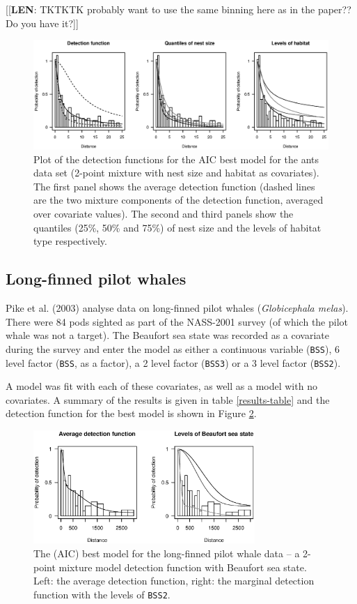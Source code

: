 \documentclass[useAMS,referee, usegraphicx]{biom}
\begin{document}
[[\textbf{LEN}: TKTKTK probably want to use the same binning here as in the paper?? Do you have it?]]

\begin{figure}
\centering
\includegraphics[width=\textwidth]{analyses/ants-nesthab.eps}
\caption{Plot of the detection functions for the AIC best model for the ants data set (2-point mixture with nest size and habitat as covariates). The first panel shows the average detection function (dashed lines are the two mixture components of the detection function, averaged over covariate values). The second and third panels show the quantiles (25\%, 50\% and 75\%) of nest size and the levels of habitat type respectively.}
\label{ants-nesthab}
\end{figure}


\subsection{Long-finned pilot whales}

Pike et al. (2003) analyse data on long-finned pilot whales (\textit{Globicephala melas}). There were 84 pods sighted as part of the NASS-2001 survey (of which the pilot whale was not a target). The Beaufort sea state was recorded as a covariate during the survey and enter the model as either a continuous variable (\texttt{BSS}), 6 level factor (\texttt{BSS}, as a factor), a 2 level factor (\texttt{BSS3}) or a 3 level factor (\texttt{BSS2}).

A model was fit with each of these covariates, as well as a model with no covariates. A summary of the results is given in table \ref{results-table} and the detection function for the best model is shown in Figure \ref{danpike-detfct}.

\begin{figure}
\centering
\includegraphics[width=0.75\textwidth]{analyses/danpike-bss2.eps}
\caption{The (AIC) best model for the long-finned pilot whale data -- a 2-point mixture model detection function with Beaufort sea state. Left: the average detection function, right: the marginal detection function with the levels of \texttt{BSS2}.}
\label{danpike-detfct}
\end{figure}
\end{document}
